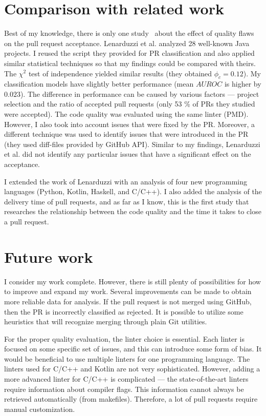\documentclass[digital,oneside,oldtable,nolof,nolot,nocover]{fithesis4}
\begin{document}
\section{Comparison with related work}
\label{sec:org69a64dc}
Best of my knowledge, there is only one study~\cite{quality} about the effect of quality flaws
on the pull request acceptance. Lenarduzzi et al. analyzed 28 well-known Java projects.
I reused the script they provided for PR classification and also applied similar statistical
techniques so that my findings could be compared with theirs.
The \(\chi^2\) test of independence yielded similar results (they obtained \(\phi_c = 0.12\)).
My classification models have slightly better performance (mean \(AUROC\) is higher by \(0.023\)).
The difference in performance can be caused by various factors --- project
selection and the ratio of accepted pull requests (only 53 \% of PRs they studied were accepted).
The code quality was evaluated using the same linter (PMD). However, I also took into
account issues that were fixed by the PR. Moreover, a different technique was used to identify
issues that were introduced in the PR (they used diff-files provided by GitHub API).
Similar to my findings, Lenarduzzi et al. did not identify any particular issues that have a significant
effect on the acceptance.

I extended the work of Lenarduzzi with an analysis of four new programming
languages (Python, Kotlin, Haskell, and C/C++).  I also added the analysis
of the delivery time of pull requests, and as far as I know, this is the first
study that researches the relationship between the code quality and the time it
takes to close a pull request.
\section{Future work}
\label{sec:org1559483}
I consider my work complete. However, there is still plenty of
possibilities for how to improve and expand my work.
Several improvements can be made to obtain more reliable data for analysis.
If the pull request is not merged using GitHub, then the PR is incorrectly classified as rejected.
It is possible to utilize some heuristics that will recognize merging through plain Git utilities.

For the proper quality evaluation, the linter choice is essential. Each
linter is focused on some specific set of issues, and this can introduce
some form of bias. It would be beneficial to use multiple linters for one
programming language. The linters used for C/C++ and Kotlin are not very
sophisticated.  However, adding a more advanced linter for C/C++ is
complicated --- the state-of-the-art linters require information about
compiler flags. This information cannot always be retrieved automatically
(from makefiles).  Therefore, a lot of pull requests require manual
customization.
\end{document}
